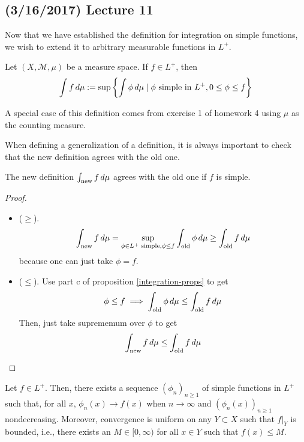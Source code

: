\documentclass[11pt,leqno,oneside]{amsbook}
\numberwithin{thm}{section}
\newcommand{\M}{\mathcal{M}}
\begin{document}
\subsection*{(3/16/2017) Lecture 11}
Now that we have established the definition for integration on simple
functions, we wish to extend it to arbitrary measurable functions in \(L^+\).
\begin{defn}
  Let $(X,\M,\mu)$ be a measure space. If $f \in L^+$, then \[
    \int f \, d\mu := \sup \left\{ \int \phi \, d\mu \mid \phi \text{ simple
        in } L^+, 0 \leq \phi \leq f \right\}
  \]
\end{defn}
\begin{example}
  A special case of this definition comes from exercise 1 of homework
  4 using $\mu$ as the counting measure.
\end{example}
When defining a generalization of a definition, it is always important
to check that the new definition agrees with the old one.
\begin{prop}
  The new definition $\int_{\text{new}} f \, d\mu$  agrees with the old
  one if $f$ is simple.
\end{prop}
\begin{proof}
  \begin{itemize}
  \item ($\geq$). \[
      \int_{\text{new}} f \, d\mu = \sup_{\phi \in L^+ \text{ simple},
        \phi \leq f} \int_{\text{old}} \phi \, d\mu \geq
      \int_{\text{old}} f \, d\mu
    \]
    because one can just take $\phi = f$.
  \item ($\leq$). Use part c of proposition \ref{integration-props} to get \[
      \phi \leq f \implies \int_{\text{old}} \phi \, d\mu \leq
      \int_{\text{old}} f \, d\mu
    \]
    Then, just take suprememum over $\phi$ to get \[
      \int_{\text{new}} f \, d\mu \leq \int_{\text{old}} f \, d\mu
    \]
  \end{itemize}
\end{proof}
\begin{thm}
  Let $f \in L^+$. Then, there exists a sequence $(\phi_n)_{n \geq 1}$
  of simple functions in $L^+$ such that, for all $x$, $\phi_n(x) \to
  f(x)$ when $n \to \infty$ and $(\phi_n(x))_{n \geq 1}$
  nondecreasing. Moreover, convergence is uniform on any $Y \subset X$
  such that $f|_Y$ is bounded, i.e., there exists an $M \in
  [0,\infty)$ for all $x \in Y$ such that $f(x) \leq M$.
\end{thm}
\end{document}
